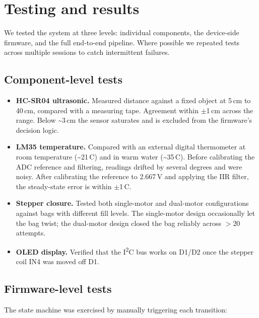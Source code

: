 \documentclass{article}
\begin{document}
\fi

\section{Testing and results}
\label{sec:testing}

We tested the system at three levels: individual components, the device-side firmware, and the full end-to-end pipeline. Where possible we repeated tests across multiple sessions to catch intermittent failures.

\subsection{Component-level tests}
\label{sec:test-components}

\begin{itemize}
    \item \textbf{HC-SR04 ultrasonic.} Measured distance against a fixed object at 5\,cm to 40\,cm, compared with a measuring tape. Agreement within $\pm$1\,cm across the range. Below \textasciitilde 3\,cm the sensor saturates and is excluded from the firmware's decision logic.
    \item \textbf{LM35 temperature.} Compared with an external digital thermometer at room temperature (\textasciitilde 21\,\textdegree C) and in warm water (\textasciitilde 35\,\textdegree C). Before calibrating the ADC reference and filtering, readings drifted by several degrees and were noisy. After calibrating the reference to 2.667\,V and applying the IIR filter, the steady-state error is within $\pm$1\,\textdegree C.
    \item \textbf{Stepper closure.} Tested both single-motor and dual-motor configurations against bags with different fill levels. The single-motor design occasionally let the bag twist; the dual-motor design closed the bag reliably across $>$20 attempts.
    \item \textbf{OLED display.} Verified that the I\textsuperscript{2}C bus works on D1/D2 once the stepper coil IN4 was moved off D1.
\end{itemize}

\subsection{Firmware-level tests}
\label{sec:test-firmware}

The state machine was exercised by manually triggering each transition:
\end{document}
